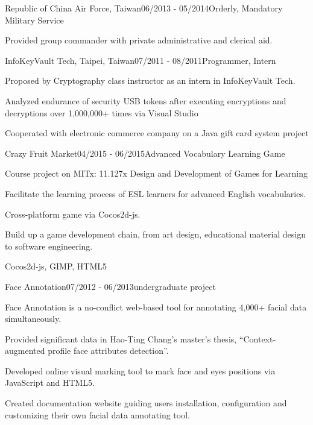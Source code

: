 \documentclass{joel_cv}
\begin{document}
\begin{sectionContentNormal}{Republic of China Air Force, Taiwan}{06/2013 - 05/2014}{Orderly, Mandatory Military Service}
  \item Provided group commander with private administrative and clerical aid.
\end{sectionContentNormal}

\begin{sectionContentNormal}{InfoKeyVault Tech, Taipei, Taiwan}{07/2011 - 08/2011}{Programmer, Intern}
  \item Proposed by Cryptography class instructor as an intern in InfoKeyVault Tech.
  \item Analyzed endurance of security USB tokens after executing encryptions and decryptions over 1,000,000+ times via Visual Studio
  \item Cooperated with electronic commerce company on a Java gift card system project
\end{sectionContentNormal}


%
%


\begin{sectionContentNormal}{Crazy Fruit Market}{04/2015 - 06/2015}{Advanced Vocabulary Learning Game}
  \item Course project on MITx: 11.127x Design and Development of Games for Learning
  \item Facilitate the learning process of ESL learners for advanced English vocabularies.
  \item Cross-platform game via Cocos2d-js.
  \item Build up a game development chain, from art design, educational material design to software engineering.
  \item Cocos2d-js, GIMP, HTML5
\end{sectionContentNormal}

\begin{sectionContentNormal}{Face Annotation}{07/2012 - 06/2013}{undergraduate project}
  \item Face Annotation is a no-conflict web-based tool for annotating 4,000+ facial data simultaneously.
  \item Provided significant data in Hao-Ting Chang’s master’s thesis, “Context-augmented profile face attributes detection”.
  \item Developed online visual marking tool to mark face and eyes positions via JavaScript and HTML5.  
  \item Created documentation website guiding users installation, configuration and customizing their own facial data annotating tool. 
\end{sectionContentNormal}
\end{document}
